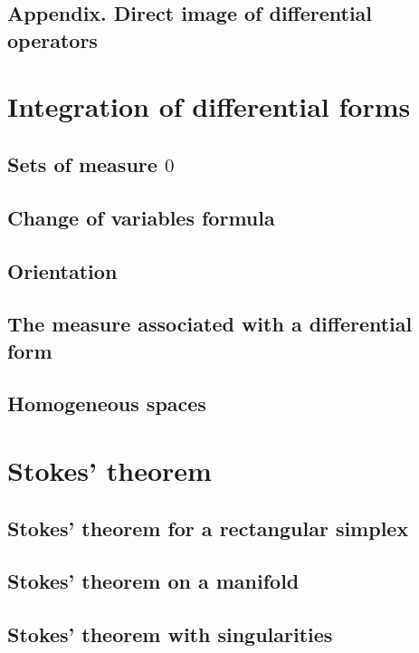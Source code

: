 \documentclass[a4paper]{article}
\begin{document}
\subsection*{Appendix. Direct image of differential operators}

\section{Integration of differential forms}

\subsection{Sets of measure $0$}

\subsection{Change of variables formula}

\subsection{Orientation}

\subsection{The measure associated with a differential form}

\subsection{Homogeneous spaces}

\section{Stokes' theorem}

\subsection{Stokes' theorem for a rectangular simplex}

\subsection{Stokes' theorem on a manifold}

\subsection{Stokes' theorem with singularities}
\end{document}
